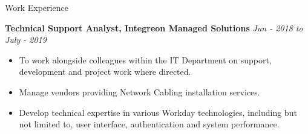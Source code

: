 \documentclass{resume} %
\begin{document}
\begin{rSection}{Work Experience}

{\bf Technical Support Analyst, Integreon Managed Solutions} \hfill {\em Jun - 2018 to July - 2019} 


\begin{itemize} 
		\vspace{-0.1cm}\item To work alongside colleagues within the IT Department on support, development and project work where directed.
        \vspace{-0.3cm}\item Manage vendors providing Network Cabling installation services.
        \vspace{-0.3cm}\item Develop technical expertise in various Workday technologies, including but not limited to, user interface, authentication and system performance.
\end{itemize}




\end{rSection}
\end{document}
